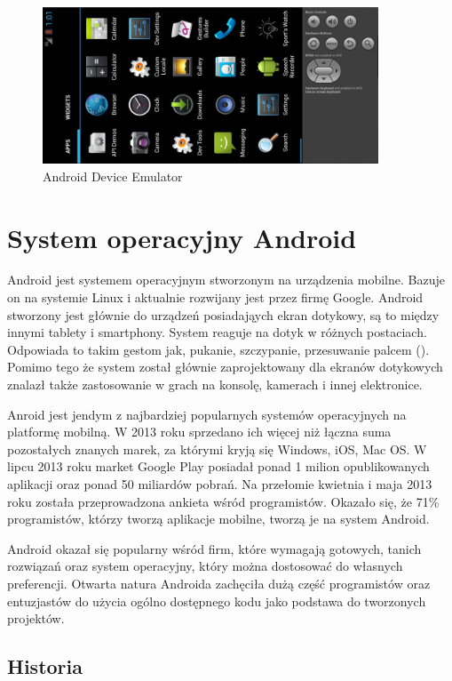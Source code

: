 \begin{figure}[th] 
\centering\includegraphics[width=10cm]{figures/emulator}
\caption{Android Device Emulator}
\end{figure}

\section{System operacyjny Android}

Android jest systemem operacyjnym stworzonym na urządzenia mobilne. Bazuje on na systemie Linux i aktualnie rozwijany jest przez firmę Google. Android stworzony jest głównie do urządzeń posiadająych ekran dotykowy, są to między innymi tablety i smartphony. System reaguje na dotyk w różnych postaciach. Odpowiada to takim gestom jak, pukanie, szczypanie, przesuwanie palcem (). Pomimo tego że system został głównie zaprojektowany dla ekranów dotykowych znalazł także zastosowanie w grach na konsolę, kamerach i innej elektronice.

Anroid jest jendym z najbardziej popularnych systemów operacyjnych na platformę mobilną. W 2013 roku sprzedano ich więcej niż łączna suma pozostałych znanych marek, za którymi kryją się Windows, iOS, Mac OS.\cite{android:1}\cite{android:3}\cite{android:3}\cite{android:4} W lipcu 2013 roku market Google Play posiadał ponad 1 milion opublikowanych aplikacji oraz ponad 50 miliardów pobrań.\cite{android:5} Na przełomie kwietnia i maja 2013 roku została przeprowadzona ankieta wśród programistów. Okazało się, że 71\% programistów, którzy tworzą aplikacje mobilne, tworzą je na system Android.\cite{android:6}

Android okazał się popularny wśród firm, które wymagają gotowych, tanich rozwiązań oraz system operacyjny, który można dostosować do własnych preferencji.\cite{android:7} Otwarta natura Androida zachęciła dużą część programistów oraz entuzjastów do użycia ogólno dostępnego kodu jako podstawa do tworzonych projektów.\cite{android:8}

\subsection{Historia}

